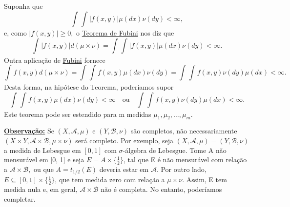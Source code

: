 \documentclass{article}
\begin{document}
 Suponha que 
  \[
    \int_{}^{}\int_{}^{}|f(x, y)|\mu (dx)\nu(dy) < \infty,
  \]
e, como \(|f(x, y)| \geq 0,\) o \hyperlink{fubini_tonelli}{Teorema de Fubini} nos diz que 
  \[
    \int_{}^{}|f(x, y)|d(\mu \times \nu) = \int_{}\int_{}^{}|f(x, y)|\mu (dx)\nu(dy) < \infty.
  \]
  Outra aplicação de \hyperlink{fubini_tonelli}{Fubini} fornece 
    \[
      \int_{}^{}f(x, y)d(\mu \times \nu) = \int_{}^{}\int_{}^{}f(x, y)\mu (dx)\nu(dy) = \int_{}^{}\int_{}^{}f(x, y)\nu (dy)\mu (dx) < \infty.
    \]
  Desta forma, na hipótese do Teorema, poderíamos supor 
    \[
      \int_{}^{}\int_{}^{}f(x, y)\mu (dx)\nu(dy) < \infty \quad \text{ou}\quad \int_{}^{}\int_{}^{}f(x, y)\nu(dy)\mu (dx) < \infty.
    \]
  Este teorema pode ser estendido para m medidas \(\mu_1, \mu _2, \dotsc , \mu_m\).

  \underline{\textbf{Observação:}} Se \((X, \mathcal{A}, \mu )\) e \((Y, \mathcal{B}, \nu)\) são completos, não necessariamente \((X\times Y, \mathcal{A}\times \mathcal{B}, \mu \times \nu)\) será completo. 
  Por exemplo, seja \((X, \mathcal{A}, \mu ) = (Y, \mathcal{B}, \nu)\) a medida de Lebesgue em \([0, 1]\) com \(\sigma \)-álgebra de Lebesgue. Tome A não mensurável em [0, 1] e seja 
  \(E = A\times \biggl\{\frac{1}{2}\biggr\}\), tal que E é não mensurável com relação a \(\mathcal{A}\times \mathcal{B},\) ou que \(A = t_{1/2}(E)\) deveria estar em \(\mathcal{A}.\) Por outro lado, \(E\subseteq [0, 1]\times \biggl\{\frac{1}{2}\biggr\}\), 
  que tem medida zero com relação a \(\mu \times \nu\). Assim, E tem medida nula e, em geral, \(\mathcal{A}\times \mathcal{B}\) não é completa. No entanto, poderíamos completar.
\end{document}
